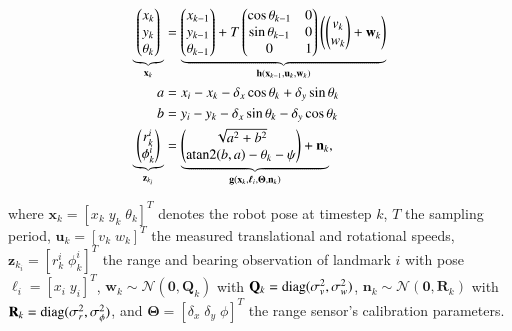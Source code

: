 \begin{equation}\label{eqn:exp_model}
  \begin{aligned}
  \underbrace {
  \begin{pmatrix}
  x_k\\
  y_k\\
  \theta_k
  \end{pmatrix}}_{\mathbf{x}_k}&=
  \underbrace{
  \begin{pmatrix}
  x_{k-1}\\
  y_{k-1}\\
  \theta_{k-1}
  \end{pmatrix} + T
  \begin{pmatrix}
  \cos\theta_{k-1}&0\\
  \sin\theta_{k-1}&0\\
  0&1
  \end{pmatrix}
  \left(\begin{pmatrix}
  v_k\\
  w_k
  \end{pmatrix}
  + \mathbf{w}_k\right)
  }_{\mathbf{h}(\mathbf{x}_{k-1}, \mathbf{u}_k, \mathbf{w}_k)}\\
  a &= x_i - x_k - \delta_x\cos\theta_k + \delta_y\sin\theta_k\\
  b &= y_i - y_k - \delta_x\sin\theta_k - \delta_y\cos\theta_k\\
  \underbrace {
  \begin{pmatrix}
  r_k^i\\
  \phi_k^i
  \end{pmatrix} }_{\mathbf{z}_{k_i}}&=
  \underbrace {
  \begin{pmatrix}
  \sqrt{a^2 + b^2}\\
  \atan2(b, a) - \theta_k - \psi
  \end{pmatrix}
  + \mathbf{n}_k}_{\mathbf{g}(\mathbf{x}_{k}, \boldsymbol{\ell}_i,
    \boldsymbol{\Theta}, \mathbf{n}_k)},
  \end{aligned}
\end{equation}

\noindent where $\mathbf{x}_k=[x_k\;y_k\;\theta_k]^T$ denotes the robot pose at
timestep $k$, $T$ the sampling period, $\mathbf{u}_k=[v_k\;w_k]^T$ the measured
translational and rotational speeds, $\mathbf{z}_{k_i}=[r_k^i\;\phi_k^i]^T$ the
range and bearing observation of landmark $i$ with pose
$\boldsymbol{\ell}_i=[x_i\;y_i]^T$, $\mathbf{w}_k\sim\mathcal{N}(\mathbf{0},
\mathbf{Q}_k)$ with $\mathbf{Q}_k=\operatorname{diag}(\sigma^2_v,\sigma^2_w)$,
$\mathbf{n}_k\sim\mathcal{N}(\mathbf{0}, \mathbf{R}_k)$ with
$\mathbf{R}_k=\operatorname{diag}(\sigma^2_r,\sigma^2_\phi)$, and
$\mathbf{\Theta}=[\delta_x\;\delta_y\;\phi]^T$ the range sensor's calibration
parameters.

